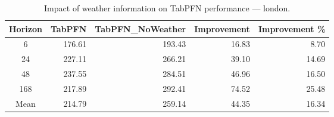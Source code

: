 \begin{table}
\centering
\caption{Impact of weather information on TabPFN performance — london.}
\label{tab:tabpfn_weather_london}
\begin{tabular}{crrrr}
\toprule
Horizon & TabPFN & TabPFN\_NoWeather & Improvement & Improvement \% \\
\midrule
6 & 176.61 & 193.43 & 16.83 & 8.70 \\
24 & 227.11 & 266.21 & 39.10 & 14.69 \\
48 & 237.55 & 284.51 & 46.96 & 16.50 \\
168 & 217.89 & 292.41 & 74.52 & 25.48 \\
\midrule
Mean & 214.79 & 259.14 & 44.35 & 16.34 \\
\bottomrule
\end{tabular}
\end{table}
